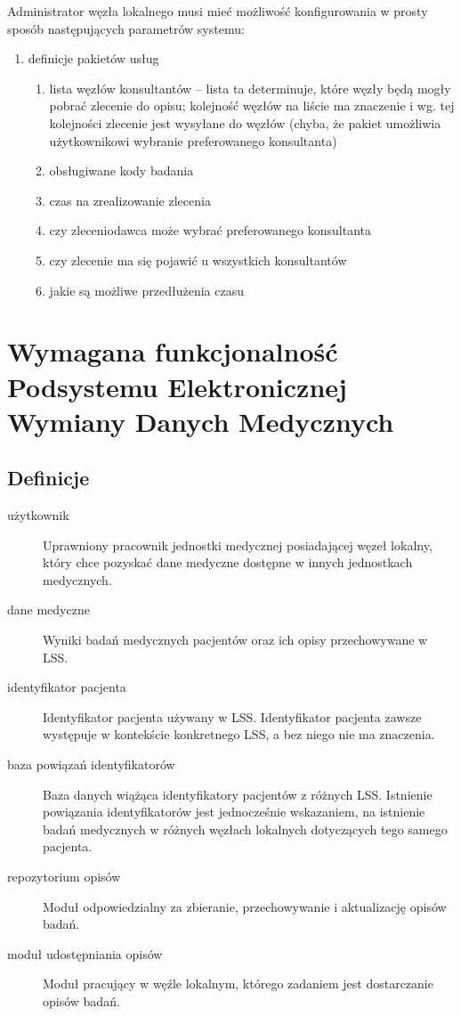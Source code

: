 \documentclass[a4paper]{report}
\begin{document}
Administrator węzła lokalnego musi mieć możliwość konfigurowania w prosty sposób następujących parametrów systemu:
\begin{enumerate}
\item definicje pakietów usług
  \begin{enumerate}
   \item lista węzłów konsultantów -- lista ta determinuje, które węzły będą mogły pobrać zlecenie do opisu; kolejność węzłów na liście ma znaczenie i wg. tej kolejności zlecenie jest wysyłane do węzłów (chyba, że pakiet umożliwia użytkownikowi wybranie preferowanego konsultanta)
   \item obsługiwane kody badania
   \item czas na zrealizowanie zlecenia
   \item czy zleceniodawca może wybrać preferowanego konsultanta
   \item czy zlecenie ma się pojawić u wszystkich konsultantów
   \item jakie są możliwe przedłużenia czasu
  \end{enumerate}


\end{enumerate}


\chapter[Podsystem Elektronicznej Wymiany Danych Medycznych]{Wymagana funkcjonalność Podsystemu Elektronicznej Wymiany Danych Medycznych}

\section{Definicje}
\begin{description}
\item[użytkownik] Uprawniony pracownik jednostki medycznej posiadającej węzeł lokalny, który chce pozyskać dane
      medyczne dostępne w innych jednostkach medycznych.
\item[dane medyczne] Wyniki badań medycznych pacjentów oraz ich opisy przechowywane w LSS.
\item[identyfikator pacjenta] Identyfikator pacjenta używany w LSS. Identyfikator pacjenta zawsze występuje w kontekście
      konkretnego LSS, a bez niego nie ma znaczenia.
\item[baza powiązań identyfikatorów] Baza danych wiążąca identyfikatory pacjentów z różnych LSS. Istnienie powiązania identyfikatorów jest jednocześnie wskazaniem, na istnienie badań medycznych w różnych węzłach lokalnych dotyczących tego samego pacjenta.
\item[repozytorium opisów] Moduł odpowiedzialny za zbieranie, przechowywanie i aktualizację opisów badań.
\item[moduł udostępniania opisów] Moduł pracujący w węźle lokalnym, którego zadaniem jest dostarczanie opisów badań.
\end{description}
\end{document}
